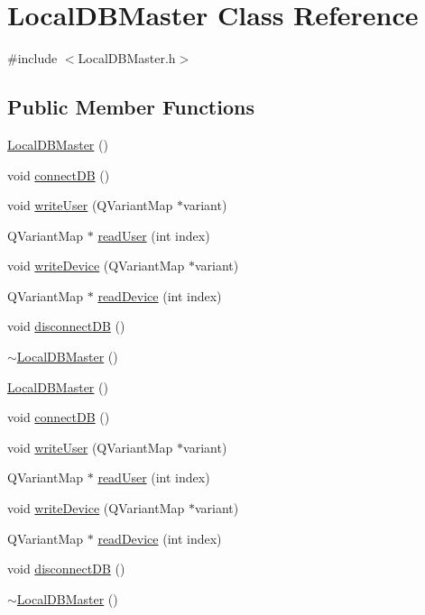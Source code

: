 \hypertarget{class_local_d_b_master}{\section{Local\-D\-B\-Master Class Reference}
\label{class_local_d_b_master}
}


{\ttfamily \#include $<$Local\-D\-B\-Master.\-h$>$}

\subsection*{Public Member Functions}
\begin{DoxyCompactItemize}
\item 
\hyperlink{class_local_d_b_master_ae5ca04f3651d2ff44b4d4498ad21fa06}{Local\-D\-B\-Master} ()
\item 
void \hyperlink{class_local_d_b_master_a171c28661abfccd29368ae18c5f62324}{connect\-D\-B} ()
\item 
void \hyperlink{class_local_d_b_master_a698874fef10d3b03b134c3b38e1320d8}{write\-User} (Q\-Variant\-Map $\ast$variant)
\item 
Q\-Variant\-Map $\ast$ \hyperlink{class_local_d_b_master_ae86b115e0ba95965a70a86c576e47119}{read\-User} (int index)
\item 
void \hyperlink{class_local_d_b_master_a6745eabb2135a6fdabef9d78e94976ee}{write\-Device} (Q\-Variant\-Map $\ast$variant)
\item 
Q\-Variant\-Map $\ast$ \hyperlink{class_local_d_b_master_a02c60b1e0e51c5e7b261107f4afaa14d}{read\-Device} (int index)
\item 
void \hyperlink{class_local_d_b_master_a3d4d74f6f85b994ab9e1affd5569c8eb}{disconnect\-D\-B} ()
\item 
\hyperlink{class_local_d_b_master_a934799106b1198aed0c1f0c7d506803c}{$\sim$\-Local\-D\-B\-Master} ()
\item 
\hyperlink{class_local_d_b_master_ae5ca04f3651d2ff44b4d4498ad21fa06}{Local\-D\-B\-Master} ()
\item 
void \hyperlink{class_local_d_b_master_a171c28661abfccd29368ae18c5f62324}{connect\-D\-B} ()
\item 
void \hyperlink{class_local_d_b_master_a698874fef10d3b03b134c3b38e1320d8}{write\-User} (Q\-Variant\-Map $\ast$variant)
\item 
Q\-Variant\-Map $\ast$ \hyperlink{class_local_d_b_master_acc3baf78009a0a3475b98fb3ebb3b098}{read\-User} (int index)
\item 
void \hyperlink{class_local_d_b_master_a6745eabb2135a6fdabef9d78e94976ee}{write\-Device} (Q\-Variant\-Map $\ast$variant)
\item 
Q\-Variant\-Map $\ast$ \hyperlink{class_local_d_b_master_abea9c0b1cd48018ff88e3a6c66c86979}{read\-Device} (int index)
\item 
void \hyperlink{class_local_d_b_master_a3d4d74f6f85b994ab9e1affd5569c8eb}{disconnect\-D\-B} ()
\item 
\hyperlink{class_local_d_b_master_a934799106b1198aed0c1f0c7d506803c}{$\sim$\-Local\-D\-B\-Master} ()
\end{DoxyCompactItemize}
